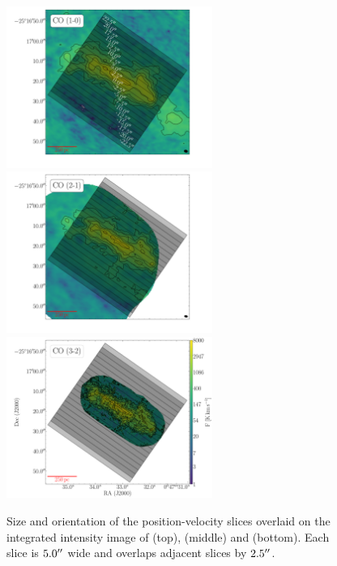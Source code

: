 \begin{figure}
	\centering
	\includegraphics[width=0.6\textwidth]{images/chapters/papers/outflow/outflow_fig4a.pdf}
	\includegraphics[width=0.6\textwidth]{images/chapters/papers/outflow/outflow_fig4b.pdf}
	\includegraphics[width=0.6\textwidth]{images/chapters/papers/outflow/outflow_fig4c.pdf}
	\caption[Outline of pV slicing]{Size and orientation of the position-velocity slices overlaid on the integrated intensity image of  (top),  (middle) and  (bottom). Each slice is $5.0^{\prime\prime}$ wide and overlaps adjacent slices by $2.5^{\prime\prime}$.}
	\label{outflow: figure: slice positions}
\end{figure}



